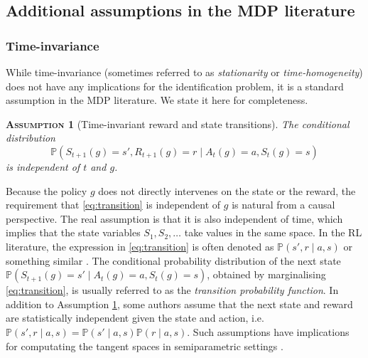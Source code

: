 \documentclass[12pt,a4paper]{article}
\newtheorem{assumption}{\normalfont\scshape Assumption}
\theoremstyle{definition}
\newcommand{\PP}[0]{\mathbb{P}}
\begin{document}
\subsection{Additional assumptions in the MDP literature} \label{sec:mdp-assumptions}

\subsubsection{Time-invariance}
While time-invariance (sometimes referred to as \emph{stationarity} or
\emph{time-homogeneity}) does not have any implications for the
identification problem, it is a standard assumption in the MDP
literature. We state it here for completeness.
\begin{assumption}[Time-invariant reward and state
  transitions]\label{assump:mdp_time_invariance}
  The conditional distribution
  \begin{equation}
    \label{eq:transition}
    \PP(S_{t+1}(g) = s', R_{t+1}(g) = r \mid A_t(g) = a, S_t(g) =
    s)
  \end{equation}
  is independent of $t$ and $g$.
\end{assumption}

Because the policy $g$ does not directly intervenes on the state or
the reward, the requirement that \eqref{eq:transition} is independent
of $g$ is natural from a causal perspective. The real assumption is
that it is also independent of time, which implies that the state
variables $S_1, S_2, \dots$ take values in the same space. In the RL
literature, the expression in \eqref{eq:transition} is often
denoted as $\PP(s', r \mid a, s)$ or something similar
\parencite{sutton_reinforcement_2018,uehara_review_2022}. The
conditional probability distribution of the next state $\PP(S_{t+1}(g)
= s' \mid A_t(g) = a, S_t(g) = s)$, obtained by marginalising
\eqref{eq:transition}, is usually referred to as the \emph{transition
  probability function}. In
addition to Assumption \ref{assump:mdp_time_invariance}, some authors
assume that the next state and reward are statistically
independent given the state and action, i.e.\ $\PP(s', r
\mid a, s) = \PP(s' \mid a, s) \PP(r \mid a, s)$. Such assumptions
have implications for computating the tangent spaces in
semiparametric settings \parencite{kallus_efficiently_2021}.
\end{document}
